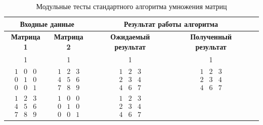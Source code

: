 \begin{table}[ht]
	\small
	\begin{center}
		\begin{threeparttable}
			\caption{Модульные тесты стандартного алгоритма умножения матриц}
			\label{tests:standart}
			\begin{tabular}{|c|c|c|c|c|}
				\hline
				\multicolumn{2}{|c|}{\bfseries Входные данные}
				& \multicolumn{2}{c|}{\bfseries Результат работы алгоритма} \\
				\hline 
				\bfseries Матрица 1
				& \bfseries Матрица 2
				& \bfseries Ожидаемый результат
				& \bfseries Полученный результат \\
				\hline
				1 & 1 & 1 & 1 \\ 
				\hline
				$\begin{matrix}
					1 & 0 & 0\\
					0 & 1 & 0\\
					0 & 0 & 1
				\end{matrix}$ 
				&  
				$\begin{matrix}
					1 & 2 & 3\\
					4 & 5 & 6\\
					7 & 8 & 9
				\end{matrix}$ 
				&
				$\begin{matrix}
					1 & 2 & 3\\
					2 & 3 & 4\\
					4 & 6 & 7
				\end{matrix}$ 
				&
				$\begin{matrix}
					1 & 2 & 3\\
					2 & 3 & 4\\
					4 & 6 & 7
				\end{matrix}$  \\ 
				\hline
				$\begin{matrix}
					1 & 2 & 3\\
					4 & 5 & 6\\
					7 & 8 & 9
				\end{matrix}$ 
				&
				$\begin{matrix}
					1 & 0 & 0\\
					0 & 1 & 0\\
					0 & 0 & 1
				\end{matrix}$ 
				&  
				$\begin{matrix}
					1 & 2 & 3\\
					2 & 3 & 4\\
					4 & 6 & 7
				\end{matrix}$ 

\end{tabular}
\end{threeparttable}
\end{center}
\end{table}
